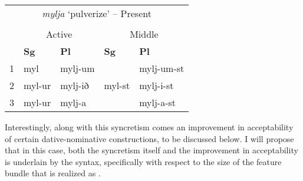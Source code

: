 \documentclass[output=paper,colorlinks,citecolor=brown,
]{langscibook}
\begin{document}
\ea \label{woodxes} \singlespacing
    \begin{tabular}[t]{l|l|l|||l|l} 
        \multicolumn{5}{c}{\textit{mylja} `pulverize' -- Present} \\
        \multicolumn{5}{c}{} \\
         & \multicolumn{2}{c}{Active} & \multicolumn{2}{c}{Middle} \\ 
        \hline
          & \textbf{Sg} & \textbf{Pl}  & \textbf{Sg} & \textbf{Pl} \\
          \hline\hline
        1 & myl & mylj-um  	&  			&  mylj-um-st \\
        2 & myl-ur & mylj-ið 		& myl-st 	&  mylj-i-st  \\
        3 & myl-ur  & mylj-a 		& 		& mylj-a-st  \\
    \end{tabular}
\z
Interestingly, along with this syncretism comes an improvement in acceptability of certain dative-nominative constructions, to be discussed below. I will propose that in this case, both the syncretism itself and the improvement in acceptability is underlain by the syntax, specifically with respect to the size of the feature bundle that is realized as \stin. %






\end{document}
